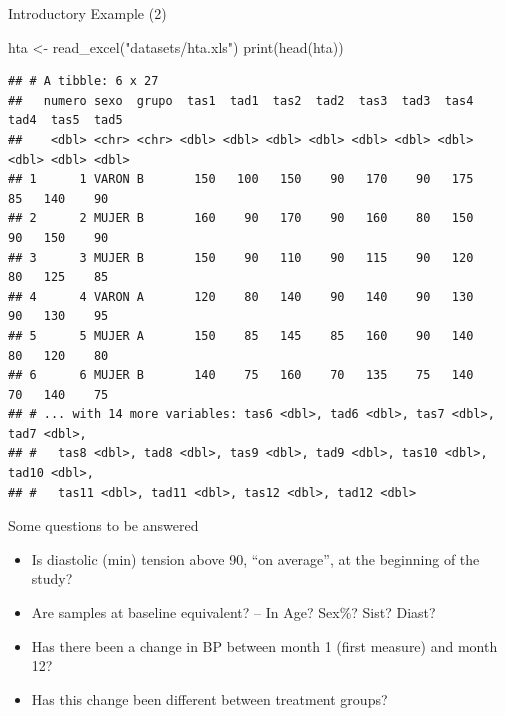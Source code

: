 \documentclass[
  ignorenonframetext,
]{beamer}
\newenvironment{Shaded}{\begin{snugshade}}{\end{snugshade}}
\newcommand{\FunctionTok}[1]{\textcolor[rgb]{0.00,0.00,0.00}{#1}}
\newcommand{\NormalTok}[1]{#1}
\newcommand{\OtherTok}[1]{\textcolor[rgb]{0.56,0.35,0.01}{#1}}
\newcommand{\StringTok}[1]{\textcolor[rgb]{0.31,0.60,0.02}{#1}}
\providecommand{\tightlist}{%
  \setlength{\itemsep}{0pt}\setlength{\parskip}{0pt}}
\begin{document}
\begin{frame}[fragile]{Introductory Example (2)}
\protect\hypertarget{introductory-example-2}{}
\begin{Shaded}
\begin{Highlighting}[]
\NormalTok{hta }\OtherTok{\textless{}{-}} \FunctionTok{read\_excel}\NormalTok{(}\StringTok{"datasets/hta.xls"}\NormalTok{)}
\FunctionTok{print}\NormalTok{(}\FunctionTok{head}\NormalTok{(hta))}
\end{Highlighting}
\end{Shaded}

\begin{verbatim}
## # A tibble: 6 x 27
##   numero sexo  grupo  tas1  tad1  tas2  tad2  tas3  tad3  tas4  tad4  tas5  tad5
##    <dbl> <chr> <chr> <dbl> <dbl> <dbl> <dbl> <dbl> <dbl> <dbl> <dbl> <dbl> <dbl>
## 1      1 VARON B       150   100   150    90   170    90   175    85   140    90
## 2      2 MUJER B       160    90   170    90   160    80   150    90   150    90
## 3      3 MUJER B       150    90   110    90   115    90   120    80   125    85
## 4      4 VARON A       120    80   140    90   140    90   130    90   130    95
## 5      5 MUJER A       150    85   145    85   160    90   140    80   120    80
## 6      6 MUJER B       140    75   160    70   135    75   140    70   140    75
## # ... with 14 more variables: tas6 <dbl>, tad6 <dbl>, tas7 <dbl>, tad7 <dbl>,
## #   tas8 <dbl>, tad8 <dbl>, tas9 <dbl>, tad9 <dbl>, tas10 <dbl>, tad10 <dbl>,
## #   tas11 <dbl>, tad11 <dbl>, tas12 <dbl>, tad12 <dbl>
\end{verbatim}
\end{frame}

\begin{frame}{Some questions to be answered}
\protect\hypertarget{some-questions-to-be-answered}{}
\begin{itemize}
\tightlist
\item
  Is diastolic (min) tension above 90, ``on average'', at the beginning
  of the study?
\item
  Are samples at baseline equivalent? -- In Age? Sex\%? Sist? Diast?
\item
  Has there been a change in BP between month 1 (first measure) and
  month 12?
\item
  Has this change been different between treatment groups?
\end{itemize}
\end{frame}
\end{document}
